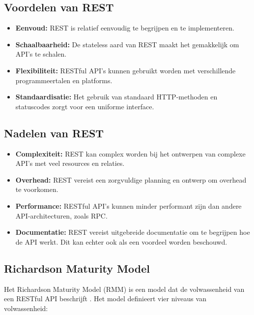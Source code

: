 \subsection{Voordelen van REST}

\begin{itemize}
  \item \textbf{Eenvoud:} REST is relatief eenvoudig te begrijpen en te implementeren.
  \item \textbf{Schaalbaarheid:} De stateless aard van REST maakt het gemakkelijk om API's te schalen.
  \item \textbf{Flexibiliteit:} RESTful API's kunnen gebruikt worden met verschillende programmeertalen en platforms.
  \item \textbf{Standaardisatie:} Het gebruik van standaard HTTP-methoden en statuscodes zorgt voor een uniforme interface.
\end{itemize}

\subsection{Nadelen van REST}

\begin{itemize}
  \item \textbf{Complexiteit:} REST kan complex worden bij het ontwerpen van complexe API's met veel resources en relaties.
  \item \textbf{Overhead:} REST vereist een zorgvuldige planning en ontwerp om overhead te voorkomen.
  \item \textbf{Performance:} RESTful API's kunnen minder performant zijn dan andere API-architecturen, zoals RPC.
  \item \textbf{Documentatie:} REST vereist uitgebreide documentatie om te begrijpen hoe de API werkt. Dit kan echter ook als een voordeel worden beschouwd.
\end{itemize}

\subsection{Richardson Maturity Model}

Het Richardson Maturity Model (RMM) is een model dat de volwassenheid van een RESTful API beschrijft \autocite{Fowler2010}. Het model definieert vier niveaus van volwassenheid:

